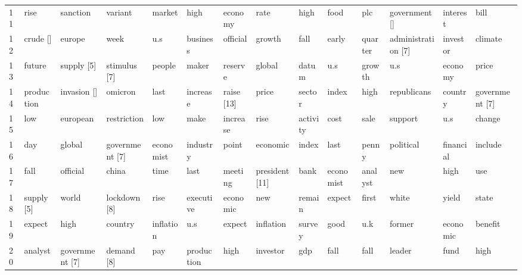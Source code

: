 \begin{sidewaystable}[H]
\begin{tabular}{p{0.3cm}|p{1.4cm}|p{1.4cm}|p{1.4cm}|p{1.4cm}|p{1.4cm}|p{1.4cm}|p{1.4cm}|p{1.4cm}|p{1.4cm}|p{1.4cm}|p{1.4cm}|p{1.4cm}|p{1.4cm}}
	11 & rise & sanction & variant & market & high & economy & rate & high & food & plc & government [\checkmark] & interest & bill \\ 
	12 & crude [\checkmark] & europe & week & u.s & business & official & growth & fall & early & quarter & administration [7] & investor & climate \\ 
	13 & future & supply [5] & stimulus [7] & people & maker & reserve & global & datum & u.s & growth & u.s & economy & price \\ 
	14 & production & invasion [\checkmark] & omicron & last & increase & raise [13] & price & sector & index & high & republicans & country & government [7] \\ 
	15 & low & european & restriction & low & make & increase & rise & activity & cost & sale & support & u.s & change \\ 
	16 & day & global & government [7] & economist & industry & point & economic & index & last & penny & political & financial & include \\ 
	17 & fall & official & china & time & last & meeting & president [11] & bank & economist & analyst & new & high & use \\ 
	18 & supply [5] & world & lockdown [8] & rise & executive & economic & new & remain & expect & first & white & yield & state \\ 
	19 & expect & high & country & inflation & u.s & expect & inflation & survey & good & u.k & former & economic & benefit \\ 
	20 & analyst & government [7] & demand [8] & pay & production & high & investor & gdp & fall & fall & leader & fund & high \\ 
		\hline
	
	\end{tabular}
\end{sidewaystable}
